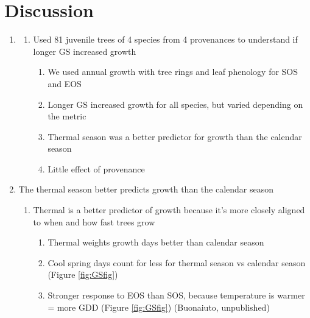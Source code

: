 \documentclass{article}\usepackage[]{graphicx}\usepackage[]{xcolor}
\begin{document}
\clearpage
\section*{Discussion}

\begin{enumerate}
\item 
  \begin{enumerate}
  \item Used 81 juvenile trees of 4 species from 4 provenances to understand if longer GS increased   growth 
    \begin{enumerate}
    \item We used annual growth with tree rings and leaf phenology for SOS and EOS
    
    \item Longer GS increased growth for all species, but varied depending on the metric 
    
    \item Thermal season was a better predictor for growth than the calendar season
    
    \item Little effect of provenance
    \end{enumerate}
  \end{enumerate}

\item The thermal season better predicts growth than the calendar season
  \begin{enumerate}
  \item Thermal is a better predictor of growth because it's more closely aligned to when and how fast trees grow
    \begin{enumerate}
    
    \item Thermal weights growth days better than calendar season
    
    \item Cool spring days count for less for thermal season vs calendar season (Figure \ref{fig:GSfig})
    
    \item Stronger response to EOS than SOS, because temperature is warmer = more GDD (Figure \ref{fig:GSfig}) (Buonaiuto, unpublished)
    

\end{enumerate}
\end{enumerate}
\end{enumerate}
\end{document}
